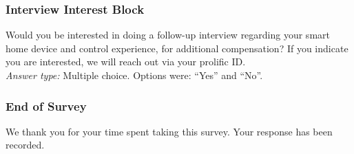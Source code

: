 \subsubsection{Interview Interest Block}
\label{appdx:survey:interview}

\printQcounter{} Would you be interested in doing a follow-up interview regarding your smart home device and control experience, for additional compensation? If you indicate you are interested, we will reach out via your prolific ID. \\
\textit{Answer type:} Multiple choice. Options were: ``Yes'' and ``No''.

\subsubsection{End of Survey}
We thank you for your time spent taking this survey.
Your response has been recorded.